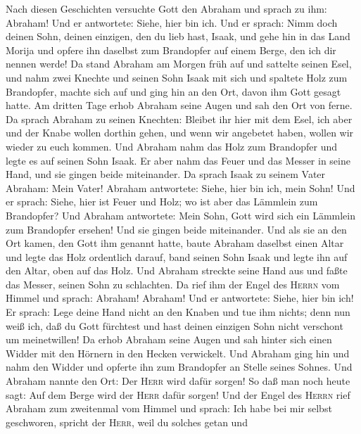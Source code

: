  Nach diesen Geschichten versuchte Gott den Abraham und
sprach zu ihm: Abraham! Und er antwortete: Siehe, hier bin ich.
 Und er sprach: Nimm doch deinen Sohn, deinen einzigen,
den du lieb hast, Isaak, und gehe hin in das Land Morija und opfere ihn
daselbst zum Brandopfer auf einem Berge, den ich dir nennen werde!
 Da stand Abraham am Morgen früh auf und sattelte seinen
Esel, und nahm zwei Knechte und seinen Sohn Isaak mit sich und spaltete
Holz zum Brandopfer, machte sich auf und ging hin an den Ort, davon ihm
Gott gesagt hatte.  Am dritten Tage erhob Abraham seine
Augen und sah den Ort von ferne.  Da sprach Abraham zu
seinen Knechten: Bleibet ihr hier mit dem Esel, ich aber und der Knabe
wollen dorthin gehen, und wenn wir angebetet haben, wollen wir wieder zu
euch kommen.  Und Abraham nahm das Holz zum Brandopfer und
legte es auf seinen Sohn Isaak. Er aber nahm das Feuer und das Messer in
seine Hand, und sie gingen beide miteinander.  Da sprach
Isaak zu seinem Vater Abraham: Mein Vater! Abraham antwortete: Siehe,
hier bin ich, mein Sohn! Und er sprach: Siehe, hier ist Feuer und Holz;
wo ist aber das Lämmlein zum Brandopfer?  Und Abraham
antwortete: Mein Sohn, Gott wird sich ein Lämmlein zum Brandopfer
ersehen! Und sie gingen beide miteinander.  Und als sie an
den Ort kamen, den Gott ihm genannt hatte, baute Abraham daselbst einen
Altar und legte das Holz ordentlich darauf, band seinen Sohn Isaak und
legte ihn auf den Altar, oben auf das Holz.  Und Abraham
streckte seine Hand aus und faßte das Messer, seinen Sohn zu schlachten.
 Da rief ihm der Engel des \textsc{Herrn} vom Himmel und
sprach: Abraham! Abraham! Und er antwortete: Siehe, hier bin ich!
 Er sprach: Lege deine Hand nicht an den Knaben und tue
ihm nichts; denn nun weiß ich, daß du Gott fürchtest und hast deinen
einzigen Sohn nicht verschont um meinetwillen!  Da erhob
Abraham seine Augen und sah hinter sich einen Widder mit den Hörnern in
den Hecken verwickelt. Und Abraham ging hin und nahm den Widder und
opferte ihn zum Brandopfer an Stelle seines Sohnes.  Und
Abraham nannte den Ort: Der \textsc{Herr} wird dafür sorgen! So daß man
noch heute sagt: Auf dem Berge wird der \textsc{Herr} dafür sorgen!
 Und der Engel des \textsc{Herrn} rief Abraham zum
zweitenmal vom Himmel  und sprach: Ich habe bei mir
selbst geschworen, spricht der \textsc{Herr}, weil du solches getan und
